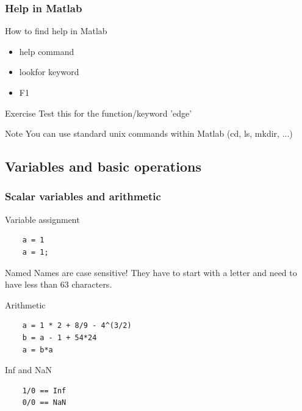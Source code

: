 \documentclass{beamer}
\begin{document}
\begin{frame}
\frametitle{Help in Matlab}
  \begin{block}{How to find help in Matlab}
  \begin{itemize}
    \item help command
    \item lookfor keyword
    \item F1
  \end{itemize}
  \end{block}

  \begin{alertblock}{Exercise}
    Test this for the function/keyword 'edge'
  \end{alertblock}
  
  \begin{block}{Note}
    You can use standard unix commands within Matlab (cd, ls, mkdir, ...)
  \end{block}
\end{frame}

\subsection{Variables and basic operations}

\begin{frame}[fragile]
\frametitle{Scalar variables and arithmetic}

  \begin{block}{Variable assignment}
  \begin{verbatim}
    a = 1
    a = 1;  \end{verbatim}
  \end{block}
  
  \pause
  
  \begin{alertblock}{Named}
    Names are case sensitive! They have to start with a letter and need to have less than 63 characters.
  \end{alertblock}
  
  \pause
  
  \begin{block}{Arithmetic}
  \begin{verbatim}
    a = 1 * 2 + 8/9 - 4^(3/2)
    b = a - 1 + 54*24
    a = b*a  \end{verbatim}
  \end{block}
  
  \pause
  
  \begin{alertblock}{Inf and NaN}
  \begin{verbatim}
    1/0 == Inf
    0/0 == NaN  \end{verbatim}
  \end{alertblock}
\end{frame}
\end{document}
